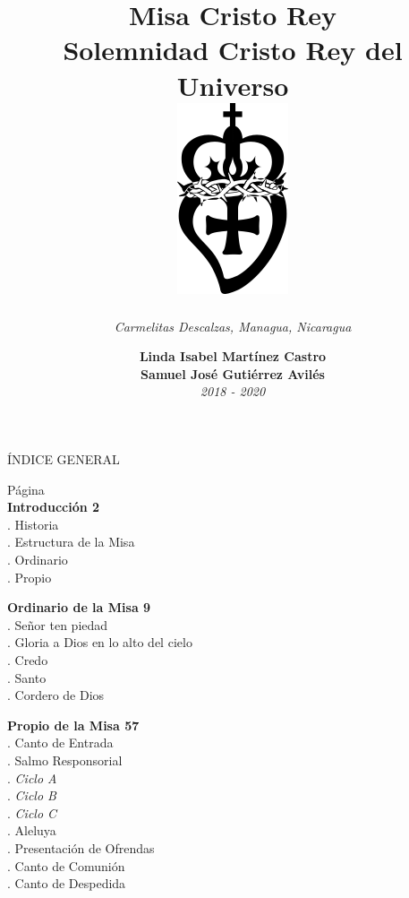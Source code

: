 \documentclass[12pt, letterpaper]{report}
\title{
  \textbf{ \Huge Misa Cristo Rey  } \\
  { \LARGE Solemnidad Cristo Rey del Universo } \\
  \vspace{2em}
  \includegraphics{logo}
}
\author{ \textit{ \large Carmelitas Descalzas, Managua, Nicaragua } }
\date{ \Large \textbf{Linda Isabel Mart\'inez Castro \\ Samuel Jos\'e Guti\'errez Avil\'es} \\ \small \textit{2018 - 2020} }
\begin{document}
    \maketitle

    \LARGE ÍNDICE GENERAL

    \large \hfill{Página}\\
    \Large \textbf{Introducción \hfill{2}}\\
    .\hspace{1cm} \large Historia \\
    .\hspace{1cm} \large Estructura de la Misa \\
    .\hspace{1cm} \large Ordinario \\
    .\hspace{1cm} \large Propio 

    \noindent
    \Large \textbf{Ordinario de la Misa \hfill{9}}\\
    .\hspace{1cm} \large Señor ten piedad \\
    .\hspace{1cm} \large Gloria a Dios en lo alto del cielo \\
    .\hspace{1cm} \large Credo \\
    .\hspace{1cm} \large Santo \\
    .\hspace{1cm} \large Cordero de Dios 

    \noindent
    \Large \textbf{Propio de la Misa \hfill{57}}\\
    .\hspace{1cm} \large Canto de Entrada \\
    .\hspace{1cm} \large Salmo Responsorial \\
    .\hspace{2cm} \large \textit{Ciclo A} \\
    .\hspace{2cm} \large \textit{Ciclo B} \\
    .\hspace{2cm} \large \textit{Ciclo C} \\
    .\hspace{1cm} \large Aleluya \\
    .\hspace{1cm} \large Presentación de Ofrendas \\
    .\hspace{1cm} \large Canto de Comunión \\
    .\hspace{1cm} \large Canto de Despedida 
    \clearpage
\end{document}
